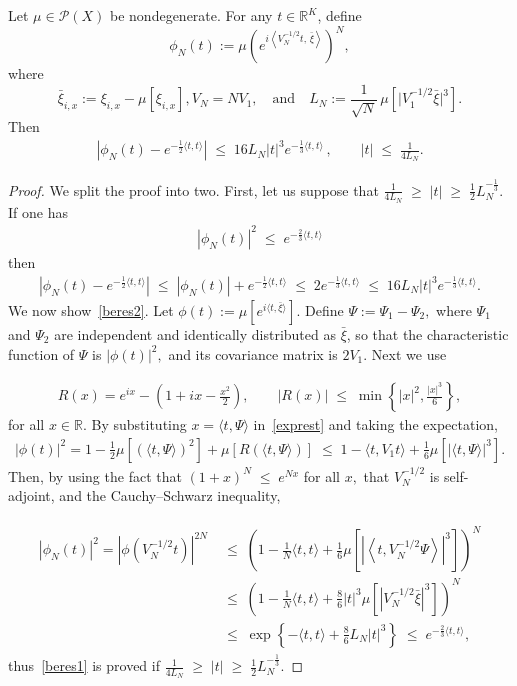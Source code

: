 \documentclass[AHL,Unicode,longabstracts,published]{cedram}
\renewcommand{\leq}{\;\leqslant\;}
\renewcommand{\geq}{\;\geqslant\;}
\newcommand{\scalar}[2]{\langle #1, #2\rangle}
\newcommand{\cP}{\mathcal{P}}
\newcommand{\bbR}{\mathbb{R}}
\begin{document}
\begin{lemm}\label{BerEs}
Let $\mu\in\cP(X)$ be nondegenerate. For any $t\in\bbR^K$, define
\[
\phi_N(t):=\mu\left(e^{i\left\langle V_N^{-1/2}t,\,\bar{\xi}\right\rangle}\right)^N,
\]
where
\[
\bar{\xi}_{i,x}:=\xi_{i,x}-\mu\left[\xi_{i,x}\right], V_N=N V_1,\quad
\text{and}\quad L_N:=\frac1{\sqrt N}\,\mu\left[\big|V_1^{-1/2}\bar{\xi}\big|^3\right].
\]
Then
\begin{align}\label{beres1}
\left|\phi_N(t)-e^{-\frac{1}{2}\scalar{t}{t}}\right|\leq16L_N|t|^3e^{-\frac{1}3\scalar{t}{t}} \,,\qquad |t|\leq \frac{1}{4L_N}.
\end{align}
\end{lemm}
\begin{proof}
We split the proof into two. First, let us suppose that $ \frac{1}{4L_N}\geq|t|\geq\frac{1}{2}L_N^{-\frac{1}{3}}.$ If one has
\begin{align}\label{beres2}
|\phi_N(t)|^2\leq e^{-\frac{2}{3}\scalar{t}{t}}
\end{align}
then
\begin{align}
\left|\phi_N(t)-e^{-\frac12\scalar{t}{t}}\right|\leq|\phi_N(t)|+e^{-\frac12\scalar{t}{t}}\leq 2e^{-\frac13\scalar{t}{t}}\leq16L_N|t|^3e^{-\frac13\scalar{t}{t}}.
\end{align}
We now show~\eqref{beres2}. Let $\phi(t) := \mu\left[e^{i\scalar t{\bar{\xi}}}\right].$ Define $\Psi:=\Psi_1 - \Psi_2,$ where $\Psi_1$ and $\Psi_2$ are independent and identically distributed as $\bar{\xi}$, so that the characteristic function of $\Psi$ is $|\phi(t)|^2,$ and its covariance matrix is $2V_1.$ Next we use

\begin{align}\label{exprest}
R(x)=e^{ix}-\left(1+ix-\frac{x^2}{2}\right),\qquad |R(x)|\leq \min\left\{|x|^2,\frac{|x|^3}{6}\right\},
\end{align}
for all $x \in \bbR.$ By substituting $x=\scalar{t}{\Psi}$ in~\eqref{exprest} and taking the expectation,
\begin{multline}\label{charfunc1}
|\phi(t)|^2 = 1-\frac{1}{2}\mu\left[\left(\scalar{t}{\Psi}\right)^2\right] + \mu\left[R\left(\scalar{t}{\Psi}\right)\right]
\leq 1-\scalar{t}{V_1t} + \frac{1}{6}\mu\left[\left|\scalar{t}{\Psi}\right|^3\right].
\end{multline}
Then, by using the fact that $(1+x)^N\leq e^{Nx}$ for all $x,$ that $V_N^{-1/2}$ is self-adjoint, and the Cauchy--Schwarz inequality,

\begin{align}
\begin{split}
|\phi_N(t)|^2 =\left|\phi\left(V_N^{-1/2}t\right)\right|^{2N}
&\leq\left(1-\frac1N \scalar{t}{t} + \frac16 \mu\left[\left|\left\langle t,V_N^{-1/2}\Psi\right\rangle\right|^3\right]\right)^N\\
&\leq \left(1-\frac1N \scalar{t}{t} + \frac{8}{6}|t|^3\mu\left[\left|V_N^{-1/2}\bar{\xi}\right|^3\right]\right)^N\\
&\leq \exp\left\{-\scalar{t}{t}+\frac{8}{6}L_N|t|^3\right\} \leq e^{-\frac{2}{3}\scalar{t}{t}},
\end{split}
\end{align}
thus~\eqref{beres1} is proved if $ \frac{1}{4L_N}\geq|t|\geq\frac{1}{2}L_N^{-\frac{1}{3}}.$


\end{proof}
\end{document}
